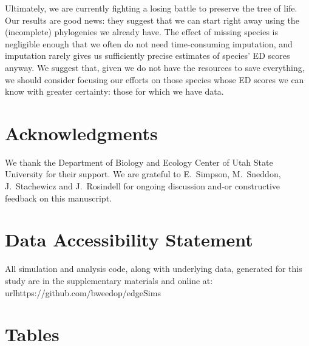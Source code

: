 \documentclass[10pt,english]{article}
\begin{document}

Ultimately, we are currently fighting a losing battle to preserve the tree of
life. Our results are good news: they suggest that we can start right away using
the (incomplete) phylogenies we already have. The effect of missing species is
negligible enough that we often do not need time-consuming imputation, and
imputation rarely gives us sufficiently precise estimates of species' ED scores
anyway. We suggest that, given we do not have the resources to save
everything, we should consider focusing our efforts on those species whose ED
scores we can know with greater certainty: those for which we have data.

\section*{Acknowledgments}
We thank the Department of Biology and Ecology Center of Utah State University
for their support. We are grateful to E.\ Simpson, M.\ Sneddon, J.\
Stachewicz and J.\ Rosindell for ongoing discussion and-or constructive feedback
on this manuscript.

\clearpage
\printbibliography

\section*{Data Accessibility Statement}
All simulation and analysis code, along with underlying data, generated for this
study are in the supplementary materials and online at:
url{https://github.com/bweedop/edgeSims}

\section*{Tables}
\end{document}
